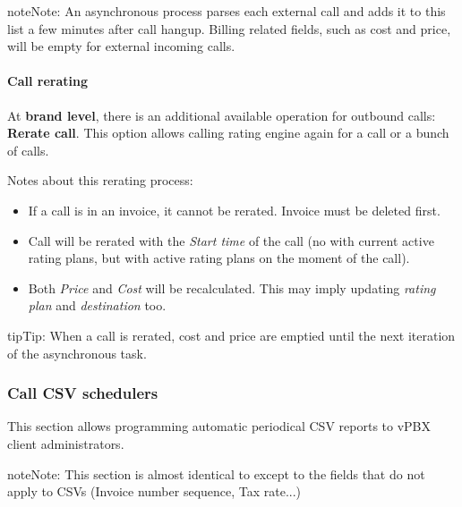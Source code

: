 \documentclass[letterpaper,10pt,english]{sphinxmanual}
\begin{document}
\begin{notice}{note}{Note:}
An asynchronous process parses each external call and adds it to this list a few minutes after call hangup. Billing related fields, such as cost and price, will be empty for external incoming calls.
\end{notice}


\paragraph{Call rerating}
\label{administration_portal/client/vpbx/calls/external_calls:call-rerating}
At \textbf{brand level}, there is an additional available operation for outbound calls: \textbf{Rerate call}. This option allows calling rating engine again for a call or a bunch of calls.

Notes about this rerating process:
\begin{itemize}
\item {} 
If a call is in an invoice, it cannot be rerated. Invoice must be deleted first.

\item {} 
Call will be rerated with the \emph{Start time} of the call (no with current active rating plans, but with active rating plans
on the moment of the call).

\item {} 
Both \emph{Price} and \emph{Cost} will be recalculated. This may imply updating \emph{rating plan} and \emph{destination} too.

\end{itemize}

\begin{notice}{tip}{Tip:}
When a call is rerated, cost and price are emptied until the next iteration of the asynchronous task.
\end{notice}
\begin{quote}
\end{quote}


\subsubsection{Call CSV schedulers}
\label{administration_portal/client/vpbx/calls/call_csv_schedulers:call-csv-schedulers}\label{administration_portal/client/vpbx/calls/call_csv_schedulers::doc}
This section allows programming automatic periodical CSV reports to vPBX client administrators.

\begin{notice}{note}{Note:}
This section is almost identical to {\hyperref[administration_portal/brand/invoicing/invoice_schedulers:invoice\string-schedulers]{}} except to the
fields that do not apply to CSVs (Invoice number sequence, Tax rate...)
\end{notice}
\end{document}
